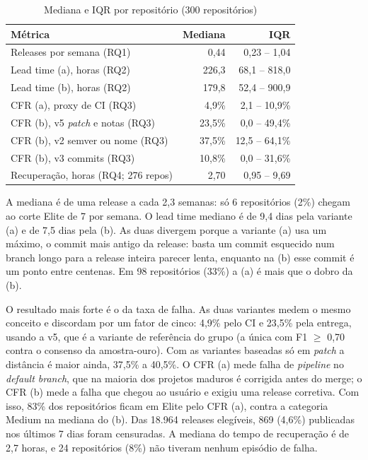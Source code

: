 \documentclass[12pt]{article}
\begin{document}
\begin{table}[ht]
\centering
\caption{Mediana e IQR por repositório (300 repositórios)}
\label{tab:desc}
\small
\begin{tabular}{lrr}
\toprule
Métrica & Mediana & IQR \\
\midrule
Releases por semana (RQ1) & 0,44 & 0,23 -- 1,04 \\
Lead time (a), horas (RQ2) & 226,3 & 68,1 -- 818,0 \\
Lead time (b), horas (RQ2) & 179,8 & 52,4 -- 900,9 \\
CFR (a), proxy de CI (RQ3) & 4,9\% & 2,1 -- 10,9\% \\
CFR (b), v5 \emph{patch} e notas (RQ3) & 23,5\% & 0,0 -- 49,4\% \\
CFR (b), v2 semver ou nome (RQ3) & 37,5\% & 12,5 -- 64,1\% \\
CFR (b), v3 commits (RQ3) & 10,8\% & 0,0 -- 31,6\% \\
Recuperação, horas (RQ4; 276 repos) & 2,70 & 0,95 -- 9,69 \\
\bottomrule
\end{tabular}
\end{table}

A mediana é de uma release a cada 2,3 semanas: só 6 repositórios (2\%) chegam
ao corte Elite de 7 por semana. O lead time mediano é de 9,4 dias pela
variante (a) e de 7,5 dias pela (b). As duas divergem porque a variante (a)
usa um máximo, o commit mais antigo da release: basta um commit esquecido num
branch longo para a release inteira parecer lenta, enquanto na (b) esse commit
é um ponto entre centenas. Em 98 repositórios (33\%) a (a) é mais que o dobro
da (b).

O resultado mais forte é o da taxa de falha. As duas variantes medem o mesmo
conceito e discordam por um fator de cinco: 4,9\% pelo CI e 23,5\% pela
entrega, usando a v5, que é a variante de referência do grupo (a única com
F1 $\ge$ 0,70 contra o consenso da amostra-ouro). Com as variantes baseadas só
em \emph{patch} a distância é maior ainda, 37,5\% a 40,5\%. O CFR (a) mede falha de \emph{pipeline} no \emph{default
branch}, que na maioria dos projetos maduros é corrigida antes do merge; o
CFR (b) mede a falha que chegou ao usuário e exigiu uma release corretiva. Com
isso, 83\% dos repositórios ficam em Elite pelo CFR (a), contra a categoria
Medium na mediana do (b). Das 18.964 releases elegíveis, 869 (4,6\%)
publicadas nos últimos 7 dias foram censuradas. A mediana do tempo de
recuperação é de 2,7 horas, e 24 repositórios (8\%) não tiveram nenhum
episódio de falha.
\end{document}
